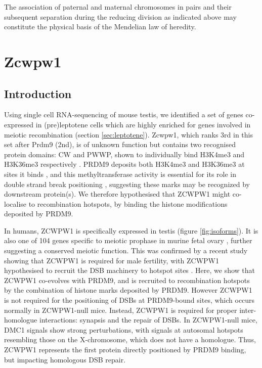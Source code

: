 \begin{savequote}[8cm]
	The association of paternal and maternal chromosomes in pairs and their subsequent separation during the reducing division as indicated above may constitute the physical basis of the Mendelian law of heredity.
\end{savequote}

\chapter{\label{ch:3-Zcw} Zcwpw1}

\minitoc

\section{Introduction}

Using single cell RNA-sequencing of mouse testis, we identified a set of genes co-expressed in (pre)leptotene cells which are highly enriched for genes involved in meiotic recombination (section \ref{sec:leptotene}). Zcwpw1, which ranks 3rd in this set after Prdm9 (2nd), is of unknown function but contains two recognised protein domains: CW and PWWP, shown to individually bind H3K4me3 and H3K36me3 respectively \cite{He2010Complex, Rona2016PWWP}. PRDM9 deposits both H3K4me3 and H3K36me3 at sites it binds \cite{Powers2016Meiotic}, and this methyltransferase activity is essential for its role in double strand break positioning \cite{Diagouraga2018PRDM9}, suggesting these marks may be recognized by downstream protein(s). We therefore hypothesised that ZCWPW1 might co-localise to recombination hotspots, by binding the histone modifications deposited by PRDM9.

In humans, ZCWPW1 is specifically expressed in testis \parencite{Carithers2015novel, Uhlen2015Tissuebased} (figure \ref{fig:isoforms}). It is also one of 104 genes specific to meiotic prophase in murine fetal ovary \parencite{Soh2015Gene}, further suggesting a conserved meiotic function. This was confirmed by a recent study showing that ZCWPW1 is required for male fertility, with ZCWPW1 hypothesised to recruit the DSB machinery to hotspot sites \parencite{Li2019histone}. Here, we show that ZCWPW1 co-evolves with PRDM9, and is recruited to recombination hotspots by the combination of histone marks deposited by PRDM9. However ZCWPW1 is not required for the positioning of DSBs at PRDM9-bound sites, which occurs normally in ZCWPW1-null mice. Instead, ZCWPW1 is required for proper inter-homologue interactions: synapsis and the repair of DSBs. In ZCWPW1-null mice, DMC1 signals show strong perturbations, with signals at autosomal hotspots resembling those on the X-chromosome, which does not have a homologue. Thus, ZCWPW1 represents the first protein directly positioned by PRDM9 binding, but impacting homologous DSB repair.

